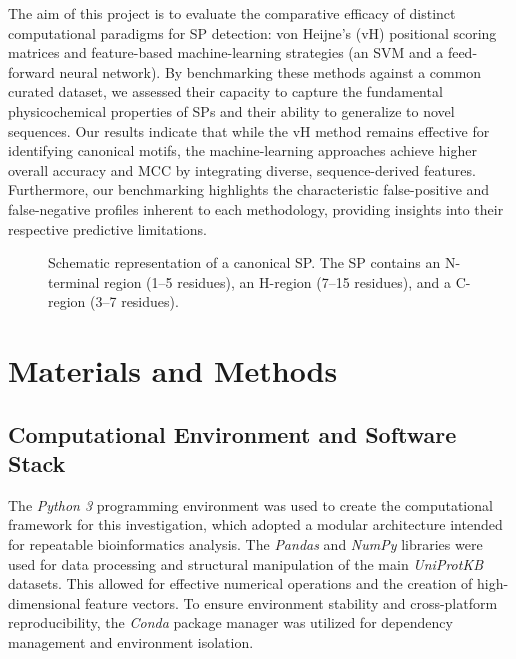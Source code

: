 \documentclass[unnumsec,webpdf,contemporary,large]{oup-authoring-template}
\begin{document}
The aim of this project is to evaluate the comparative efficacy of distinct computational paradigms for SP detection: von Heijne's (vH) positional scoring matrices and feature-based machine-learning strategies (an SVM and a feed-forward neural network). By benchmarking these methods against a common curated dataset, we assessed their capacity to capture the fundamental physicochemical properties of SPs and their ability to generalize to novel sequences. Our results indicate that while the vH method remains effective for identifying canonical motifs, the machine-learning approaches achieve higher overall accuracy and MCC by integrating diverse, sequence-derived features. Furthermore, our benchmarking highlights the characteristic false-positive and false-negative profiles inherent to each methodology, providing insights into their respective predictive limitations.

\begin{figure}[t]
\centering
\caption{Schematic representation of a canonical SP. The SP contains an N-terminal region (1--5 residues), an H-region (7--15 residues), and a C-region (3--7 residues).}
\label{fig:sp}
\end{figure}


\section{Materials and Methods}

\subsection{Computational Environment and Software Stack}

The \textit{Python 3} programming environment was used to create the computational framework for this investigation, which adopted a modular architecture intended for repeatable bioinformatics analysis. The \textit{Pandas} and \textit{NumPy} libraries were used for data processing and structural manipulation of the main \textit{UniProtKB} datasets. This allowed for effective numerical operations and the creation of high-dimensional feature vectors. To ensure environment stability and cross-platform reproducibility, the \textit{Conda} package manager was utilized for dependency management and environment isolation.
\end{document}
